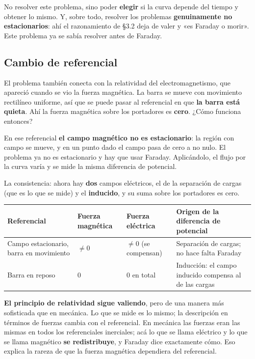 \documentclass[12pt,a4paper]{article}
\begin{document}
\begin{notebox}
No resolver este problema, sino poder \textbf{elegir} si la
curva depende del tiempo y obtener lo mismo. Y, sobre todo, resolver los
problemas \textbf{genuinamente no estacionarios}: ahí el razonamiento de §3.2 deja
de valer y «es Faraday o morir». Este problema ya se sabía resolver antes de
Faraday.
\end{notebox}

\subsection{Cambio de referencial}

El problema también conecta con la relatividad del electromagnetismo, que
apareció cuando se vio la fuerza magnética. La barra se mueve con movimiento
rectilíneo uniforme, así que se puede pasar al referencial en que \textbf{la barra
está quieta}. Ahí la fuerza magnética sobre los portadores es \textbf{cero}.
¿Cómo funciona entonces?

En ese referencial \textbf{el campo magnético no es estacionario}: la región con
campo se mueve, y en un punto dado el campo pasa de cero a no nulo. El problema
ya no es estacionario y hay que usar Faraday. Aplicándolo, el flujo por la
curva varía y se mide la misma diferencia de potencial.

La consistencia: ahora hay \textbf{dos} campos eléctricos, el de la separación de
cargas (que es lo que se mide) y el \textbf{inducido}, y su suma sobre los
portadores es cero.

\begin{center}
\renewcommand{\arraystretch}{1.35}
\small
\begin{tabularx}{\textwidth}{>{\raggedright\arraybackslash}X>{\raggedright\arraybackslash}X>{\raggedright\arraybackslash}X>{\raggedright\arraybackslash}X}
\toprule
\textbf{Referencial} & \textbf{Fuerza magnética} & \textbf{Fuerza eléctrica} & \textbf{Origen de la diferencia de potencial} \\
\midrule
Campo estacionario, barra en movimiento & $\neq0$ & $\neq0$ (se compensan) & Separación de cargas; no hace falta Faraday \\
Barra en reposo & $0$ & $0$ en total & Inducción: el campo inducido compensa al de las cargas \\
\bottomrule
\end{tabularx}
\end{center}

\begin{notebox}
\textbf{El principio de relatividad sigue valiendo}, pero de una manera más
sofisticada que en mecánica. Lo que se mide es lo mismo; la descripción en
términos de fuerzas cambia con el referencial. En mecánica las fuerzas eran
las mismas en todos los referenciales inerciales; acá lo que se llama
eléctrico y lo que se llama magnético \textbf{se redistribuye}, y Faraday dice
exactamente cómo. Eso explica la rareza de que la fuerza magnética dependiera
del referencial.
\end{notebox}
\end{document}
